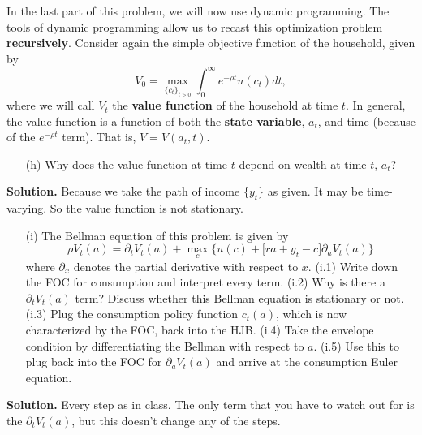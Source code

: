 \documentclass[11pt]{extarticle}
\theoremstyle{plain}
\theoremstyle{definition}
\begin{document}
\vspace{10mm}
\noindent
In the last part of this problem, we will now use dynamic programming. The tools of dynamic programming allow us to recast this optimization problem \textbf{recursively}. Consider again the simple objective function of the household, given by
\begin{equation*}
	V_0 = \max_{\{c_t\}_{t>0}} \int_0^\infty e^{-\rho t} u(c_t) dt,
\end{equation*}
where we will call $V_t$ the \textbf{value function} of the household at time $t$. In general, the value function is a function of both the \textbf{state variable}, $a_t$, and time (because of the $e^{-\rho t}$ term). That is, $V = V(a_t, t)$. 

\begin{enumerate}
	\item [(h)] Why does the value function at time $t$ depend on wealth at time $t$, $a_t$? 
\end{enumerate}


\vspace{5mm}
\noindent
\textbf{Solution.} Because we take the path of income $\{ y_t \}$ as given. It may be time-varying. So the value function is not stationary. 


\begin{enumerate}
	\item [(i)] The Bellman equation of this problem is given by
	\begin{equation*}
		\rho V_t(a) = \partial_t V_t(a) + \max_c \bigg\{ u(c) + \Big[ ra + y_t - c \Big] \partial_a V_t(a) \bigg\}
	\end{equation*}
	where $\partial_x$ denotes the partial derivative with respect to $x$. (i.1) Write down the FOC for consumption and interpret every term. (i.2) Why is there a $\partial_t V_t(a)$ term? Discuss whether this Bellman equation is stationary or not. (i.3) Plug the consumption policy function $c_t(a)$, which is now characterized by the FOC, back into the HJB. (i.4) Take the envelope condition by differentiating the Bellman with respect to $a$. (i.5) Use this to plug back into the FOC for $\partial_a V_t(a)$ and arrive at the consumption Euler equation.
\end{enumerate}

\vspace{5mm}
\noindent
\textbf{Solution.} Every step as in class. The only term that you have to watch out for is the $\partial_t V_t(a)$, but this doesn't change any of the steps. 
\end{document}
